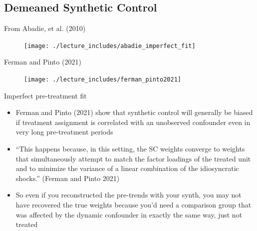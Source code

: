 \documentclass{beamer}
\begin{document}
\subsection{Demeaned Synthetic Control}

\begin{frame}{From Abadie, et al. (2010)}

	\begin{figure}
	\texttt{[image: ./lecture\_includes/abadie\_imperfect\_fit]}
	\end{figure}

\end{frame}


\begin{frame}{Ferman and Pinto (2021)}

	\begin{figure}
	\texttt{[image: ./lecture\_includes/ferman\_pinto2021]}
	\end{figure}

\end{frame}






\begin{frame}{Imperfect pre-treatment fit }

\begin{itemize}

\item Ferman and Pinto (2021) show that synthetic control will generally be biased if treatment assignment is correlated with an unobserved confounder even in very long pre-treatment periods

\item ``This happens because, in this setting, the SC weights converge to weights that simultaneously attempt to match the factor loadings of the treated unit and to minimize the variance of a linear combination of the idiosyncratic shocks.'' (Ferman and Pinto 2021)

\item So even if you reconstructed the pre-trends with your synth, you may not have recovered the true weights because you'd need a comparison group that was affected by the dynamic confounder in exactly the same way, just not treated

\end{itemize}

\end{frame}
\end{document}
